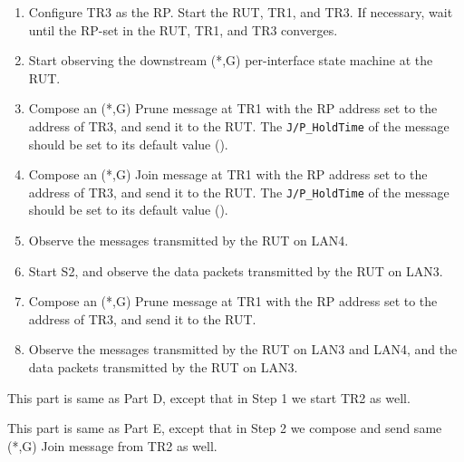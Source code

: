 \documentclass[11pt]{report}
\begin{document}
\begin{enumerate}

  \item Configure TR3 as the RP. Start the RUT, TR1, and TR3. If
  necessary, wait until the RP-set in the RUT, TR1, and TR3
  converges.

  \item Start observing the downstream (*,G) per-interface state
  machine at the RUT.

  \item Compose an (*,G) Prune message at TR1 with the RP address set
  to the address of TR3, and send it to the RUT.
  The \verb=J/P_HoldTime= of the message should be set to its default
  value ({\PimsmJPHoldTime}).

  \item Compose an (*,G) Join message at TR1 with the RP address set
  to the address of TR3, and send it to the RUT.
  The \verb=J/P_HoldTime= of the message should be set to its default
  value ({\PimsmJPHoldTime}).

  \item Observe the messages transmitted by the RUT on LAN4.

  \item Start S2, and observe the data packets transmitted by the RUT on
  LAN3.

  \item Compose an (*,G) Prune message at TR1 with the RP address set
  to the address of TR3, and send it to the RUT.

  \item Observe the messages transmitted by the RUT on LAN3 and LAN4,
  and the data packets transmitted by the RUT on LAN3.

\end{enumerate}


This part is same as Part D, except that in Step 1 we start TR2 as well.


This part is same as Part E, except that in Step 2 we compose and send
same (*,G) Join message from TR2 as well.

\end{document}
